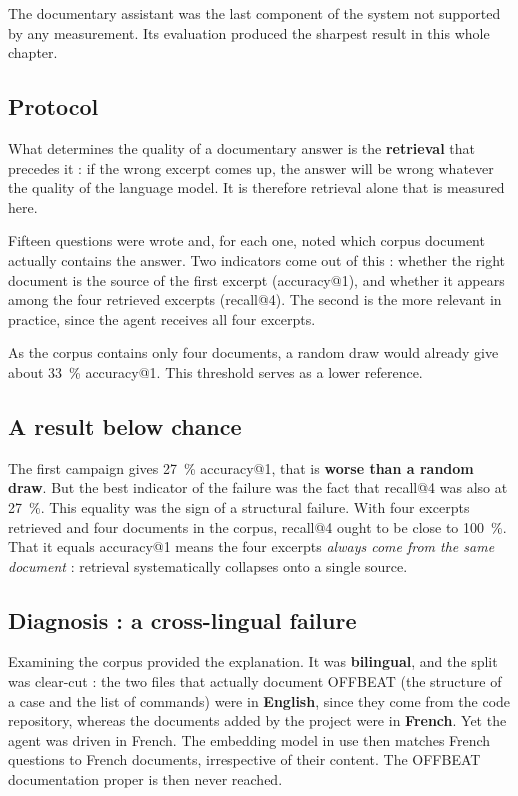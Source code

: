 \documentclass[12pt,a4paper]{report}
\begin{document}
The documentary assistant was the last component of the system not supported by
any measurement. Its evaluation produced the sharpest result in this whole
chapter.

\subsection{Protocol}

What determines the quality of a documentary answer is the \textbf{retrieval}
that precedes it : if the wrong excerpt comes up, the answer will be wrong
whatever the quality of the language model. It is therefore retrieval alone that
is measured here.

Fifteen questions were wrote and, for each one, noted which corpus document
actually contains the answer. Two indicators come out of this : whether the right
document is the source of the first excerpt (accuracy@1), and whether it appears
among the four retrieved excerpts (recall@4). The second is the more relevant in practice,
since the agent receives all four excerpts.

As the corpus contains only four documents, a random draw would already give
about \SI{33}{\percent} accuracy@1. This threshold serves as a lower reference.

\subsection{A result below chance}

The first campaign gives \SI{27}{\percent} accuracy@1, that is \textbf{worse
than a random draw}. But the best indicator of the failure was the fact that recall@4
was also at \SI{27}{\percent}.
This equality was the sign of a structural failure. With four excerpts retrieved
and four documents in the corpus, recall@4 ought to be close to
\SI{100}{\percent}. That it equals accuracy@1 means the four excerpts
\emph{always come from the same document} : retrieval systematically collapses
onto a single source.

\subsection{Diagnosis : a cross-lingual failure}

Examining the corpus provided the explanation. It was \textbf{bilingual}, and the
split was clear-cut : the two files that actually document OFFBEAT (the structure
of a case and the list of commands) were in \textbf{English}, since they come
from the code repository, whereas the documents added by the project were in
\textbf{French}. Yet the agent was driven in French. The embedding model in use then matches
French questions to French documents, irrespective of their content. The OFFBEAT
documentation proper is then never reached.
\end{document}
